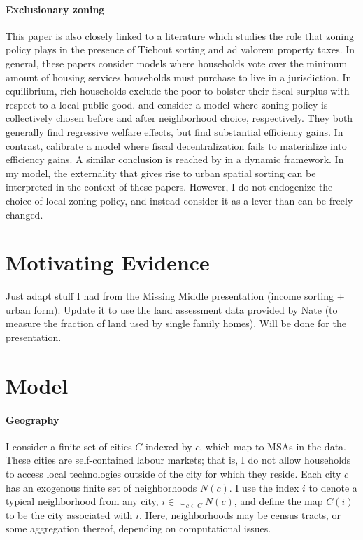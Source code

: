 \documentclass[]{article}
\begin{document}
\paragraph*{Exclusionary zoning}
This paper is also closely linked to a literature which studies the role that zoning policy plays in the presence of Tiebout sorting and ad valorem property taxes. In general, these papers consider models where households vote over the minimum amount of housing services households must purchase to live in a jurisdiction. In equilibrium, rich households exclude the poor to bolster their fiscal surplus with respect to a local public good. \cite{calabresetal} and \cite{keepingpeopleout} consider a model where zoning policy is collectively chosen before and after neighborhood choice, respectively. They both generally find regressive welfare effects, but find substantial efficiency gains. In contrast, \cite{ineffTiebout} calibrate a model where fiscal decentralization fails to materialize into efficiency gains. A similar conclusion is reached by \cite{barcoate} in a dynamic framework. In my model, the externality that gives rise to urban spatial sorting can be interpreted in the context of these papers. However, I do not endogenize the choice of local zoning policy, and instead consider it as a lever than can be freely changed. 


\section{Motivating Evidence}
Just adapt stuff I had from the Missing Middle presentation (income sorting + urban form). Update it to use the land assessment data provided by Nate (to measure the fraction of land used by single family homes). Will be done for the presentation.

\section{Model}
\paragraph*{Geography}
I consider a finite set of cities $C$ indexed by $c$, which map to MSAs in the data. These cities are self-contained labour markets; that is, I do not allow households to access local technologies outside of the city for which they reside. Each city $c$ has an exogenous finite set of neighborhoods $N(c)$. I use the index $i$ to denote a typical neighborhood from any city, $i \in \cup_{c \in C}N(c)$, and define the map $C(i)$ to be the city associated with $i$. Here, neighborhoods may be census tracts, or some aggregation thereof, depending on computational issues. 
\end{document}
